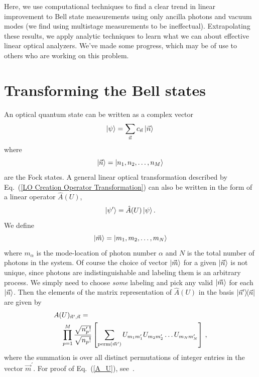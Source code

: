 \documentclass[aps,pra,twocolumn,showpacs,superscriptaddress,floatfix,10pt]{revtex4}
\begin{document}
Here, we use computational techniques to find a clear trend in linear improvement to Bell state measurements using only ancilla photons and vacuum modes (we find using multistage measurements to be ineffectual). Extrapolating these results, we apply analytic techniques to learn what we can about effective linear optical analyzers. We've made some progress, which may be of use to others who are working on this problem.
\section{Transforming the Bell states}
An optical quantum state can be written as a complex vector
\begin{equation}
\label{LO State Fock Vec Basis}
\ket{\psi} = \sum_{\vec{n}} c_{\vec{n}} \ket{\vec{n}} \,
\end{equation}
where
\begin{equation}
\ket{\vec{n}} = \ket{n_1,n_2,\dots,n_M}
\end{equation}
are the Fock states. A general linear optical transformation described by Eq.~(\ref{LO Creation Operator Transformation}) can also be written in the form of a linear operator $\hat{A}(U)$,
\begin{equation}
	\ket{\psi^\prime} = \hat{A}(U) \ket{\psi}.
\end{equation}
We define
\begin{equation}
\label{m definition}
\ket{\vec{m}} = \ket{m_1,m_2,\dots,m_N}
\end{equation}
where $m_\alpha$ is the mode-location of photon number $\alpha$ and $N$ is the total number of photons in the system. Of course the choice of vector $\ket{\vec{m}}$ for a given $\ket{\vec{n}}$ is not unique, since photons are indistinguishable and labeling them is an arbitrary process. We simply need to choose \textit{some} labeling and pick any valid $\ket{\vec{m}}$ for each $\ket{\vec{n}}$. Then the elements of the matrix representation of $\hat{A}(U)$ in the basis $\outerproduct{\vec{n}^\prime}{\vec{n}}$ are given by
\begin{eqnarray}
\label{A_U}
A(U)_{\vec{n}^\prime,\vec{n}} = \quad \quad \quad \quad \quad \quad \quad \quad \quad \quad \quad \quad \quad \quad \quad \quad \quad \\ \small \nonumber \prod_{p=1}^{M} \frac{\sqrt{n_p^\prime !}}{\sqrt{n_p !}} \left[\sum_{\textrm{perm}(\vec{m}^\prime)} U_{m_1 m_1^\prime} U_{m_2 m_2^\prime} \dots U_{m_N m_N^\prime} \right] \,,
\end{eqnarray}
where the summation is over all distinct permutations of integer entries in the vector $\vec{m}^\prime$. For proof of Eq.~(\ref{A_U}), see~\cite{Jake Smith}.
\end{document}
